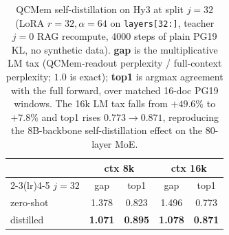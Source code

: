 \begin{table}[t]
\centering
\small
\begin{tabular}{@{}lcccc@{}}
\toprule
 & \multicolumn{2}{c}{ctx 8k} & \multicolumn{2}{c}{ctx 16k} \\
\cmidrule(lr){2-3}\cmidrule(lr){4-5}
\textbf{$j{=}32$} & gap & top1 & gap & top1 \\
\midrule
zero-shot  & 1.378 & 0.823 & 1.496 & 0.773 \\
distilled  & \textbf{1.071} & \textbf{0.895} & \textbf{1.078} & \textbf{0.871} \\
\bottomrule
\end{tabular}
\caption{QCMem self-distillation on Hy3 at split $j{=}32$ (LoRA $r{=}32,
\alpha{=}64$ on \texttt{layers[32:]}, teacher $j{=}0$ RAG recompute, 4000 steps of
plain PG19 KL, no synthetic data). \textbf{gap} is the multiplicative LM tax
(QCMem-readout perplexity / full-context perplexity; $1.0$ is exact); \textbf{top1}
is argmax agreement with the full forward, over matched 16-doc PG19 windows. The
16k LM tax falls from $+49.6\%$ to $+7.8\%$ and top1 rises $0.773\to0.871$,
reproducing the 8B-backbone self-distillation effect on the 80-layer MoE.}
\label{tab:hy3distill}
\end{table}
